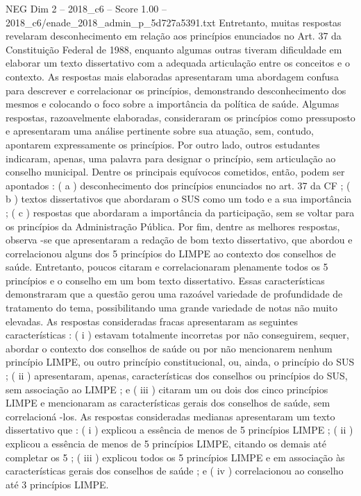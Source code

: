 \begin{textsample}{NEG Dim 2 – 2018\_c6 – Score 1.00 – 2018\_c6/enade\_2018\_admin\_p\_5d727a5391.txt}
Entretanto, muitas respostas revelaram desconhecimento em relação aos princípios enunciados no Art. 37 da Constituição Federal de 1988, enquanto algumas outras tiveram dificuldade em elaborar um texto dissertativo com a adequada articulação entre os conceitos e o contexto.
As respostas mais elaboradas apresentaram uma abordagem confusa para descrever e correlacionar os princípios, demonstrando desconhecimento dos mesmos e colocando o foco sobre a importância da política de saúde.
Algumas respostas, razoavelmente elaboradas, consideraram os princípios como pressuposto e apresentaram uma análise pertinente sobre sua atuação, sem, contudo, apontarem expressamente os princípios.
Por outro lado, outros estudantes indicaram, apenas, uma palavra para designar o princípio, sem articulação ao conselho municipal.
Dentre os principais equívocos cometidos, então, podem ser apontados : ( a ) desconhecimento dos princípios enunciados no art. 37 da CF ; ( b ) textos dissertativos que abordaram o SUS como um todo e a sua importância ; ( c ) respostas que abordaram a importância da participação, sem se voltar para os princípios da Administração Pública.
Por fim, dentre as melhores respostas, observa -se que apresentaram a redação de bom texto dissertativo, que abordou e correlacionou alguns dos 5 princípios do LIMPE ao contexto dos conselhos de saúde.
Entretanto, poucos citaram e correlacionaram plenamente todos os 5 princípios e o conselho em um bom texto dissertativo.
Essas características demonstraram que a questão gerou uma razoável variedade de profundidade de tratamento do tema, possibilitando uma grande variedade de notas não muito elevadas.
As respostas consideradas fracas apresentaram as seguintes características : ( i ) estavam totalmente incorretas por não conseguirem, sequer, abordar o contexto dos conselhos de saúde ou por não mencionarem nenhum princípio LIMPE, ou outro princípio constitucional, ou, ainda, o princípio do SUS ; ( ii ) apresentaram, apenas, características dos conselhos ou princípios do SUS, sem associação ao LIMPE ; e ( iii ) citaram um ou dois dos cinco princípios LIMPE e mencionaram as características gerais dos conselhos de saúde, sem correlacioná -los.
As respostas consideradas medianas apresentaram um texto dissertativo que : ( i ) explicou a essência de menos de 5 princípios LIMPE ; ( ii ) explicou a essência de menos de 5 princípios LIMPE, citando os demais até completar os 5 ; ( iii ) explicou todos os 5 princípios LIMPE e em associação às características gerais dos conselhos de saúde ; e ( iv ) correlacionou ao conselho até 3 princípios LIMPE.

\end{textsample}

